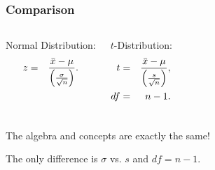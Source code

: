 \begin{frame}
  \frametitle{Comparison}

  \begin{columns}
    Normal Distribution:
    \begin{eqnarray*}
      z &  = & \frac{\bar{x}-\mu}{\left( \frac{\sigma}{\sqrt{n}} \right)}.
    \end{eqnarray*}

    $t$-Distribution:
    \begin{eqnarray*}
      t &  = & \frac{\bar{x}-\mu}{\left( \frac{s}{\sqrt{n}} \right)}, \\
      df & = & n-1.
    \end{eqnarray*}

  \end{columns}

  \vfill

    {

      \begin{center}
        The algebra and concepts are exactly the same!

        The only difference is $\sigma$ vs. $s$ and $df=n-1$.
      \end{center}
    }

    \vfill
  

\end{frame}


